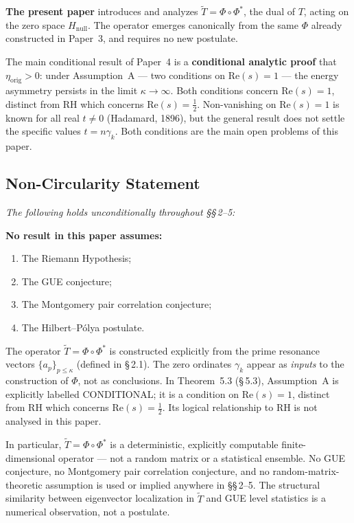 \documentclass[11pt]{article}
\newcommand{\Hnull}{H_{\mathrm{null}}}
\newcommand{\etaorig}{\eta_{\mathrm{orig}}}
\newcommand{\Tt}{\widetilde{T}}
\begin{document}
\textbf{The present paper} introduces and analyzes
$\Tt = \Phi\circ\Phi^*$, the dual of $T$, acting on the zero space
$\Hnull$.
The operator emerges canonically from the same $\Phi$ already constructed
in Paper~3, and requires no new postulate.

The main conditional result of Paper~4
is a \textbf{conditional analytic proof} that $\etaorig > 0$: under Assumption~A --- two conditions
on $\mathrm{Re}(s)=1$ --- the energy asymmetry persists in the limit
$\kappa\to\infty$.
Both conditions concern $\mathrm{Re}(s)=1$, distinct from RH which concerns
$\mathrm{Re}(s)=\tfrac{1}{2}$.
Non-vanishing on $\mathrm{Re}(s)=1$ is known for all real $t\neq 0$
(Hadamard, 1896), but the general result does not settle the specific
values $t = n\gamma_k$. Both conditions are the main open problems of
this paper.

\subsection{Non-Circularity Statement}

\emph{The following holds unconditionally throughout \S\S\,2--5:}

\textbf{No result in this paper assumes:}
\begin{enumerate}[label=(\roman*)]
\item The Riemann Hypothesis;
\item The GUE conjecture;
\item The Montgomery pair correlation conjecture;
\item The Hilbert--P\'olya postulate.
\end{enumerate}

The operator $\Tt = \Phi\circ\Phi^*$ is constructed explicitly from
the prime resonance vectors $\{a_p\}_{p\leq\kappa}$ (defined in \S\,2.1).
The zero ordinates $\gamma_k$ appear as \emph{inputs} to the construction
of $\Phi$, not as conclusions.
In Theorem~5.3 (\S\,5.3), Assumption~A is explicitly
labelled CONDITIONAL; it is a condition on $\mathrm{Re}(s)=1$, distinct
from RH which concerns $\mathrm{Re}(s)=\tfrac{1}{2}$.
Its logical relationship to RH is not analysed in this paper.

In particular, $\Tt = \Phi\circ\Phi^*$ is a deterministic,
explicitly computable finite-dimensional operator --- not a random matrix
or a statistical ensemble.
No GUE conjecture, no Montgomery pair correlation conjecture,
and no random-matrix-theoretic assumption is used or implied anywhere
in \S\S\,2--5.
The structural similarity between eigenvector localization in $\Tt$ and
GUE level statistics is a numerical observation, not a postulate.
\end{document}
